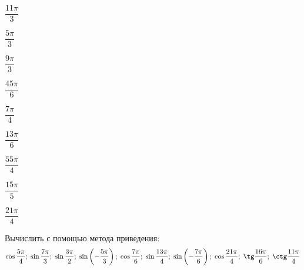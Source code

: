\begin{class}[number=3]
\begin{listofex}[resume]
\begin{enumcols}[itemcolumns=5]
			\item \( \dfrac{11\pi}{3} \)
			\item \( \dfrac{5\pi}{3} \)
			\item \( \dfrac{9\pi}{3} \)
			\item \( \dfrac{45\pi}{6} \)
			\item \( \dfrac{7\pi}{4} \)
			\item \( \dfrac{13\pi}{6} \)
			\item \( \dfrac{55\pi}{4} \)
			\item \( \dfrac{15\pi}{5} \)
			\item \( \dfrac{21\pi}{4} \)
		\end{enumcols}
		\item Вычислить с помощью метода приведения:
		\[ \cos\dfrac{5\pi}{4};\;\sin\dfrac{7\pi}{3};\;\sin\dfrac{3\pi}{2};\;\sin\left( -\dfrac{5\pi}{3} \right);\;\cos\dfrac{7\pi}{6};\;\sin\dfrac{13\pi}{4};\;\sin\left( -\dfrac{7\pi}{6}  \right);\;\cos\dfrac{21\pi}{4};\;\tg\dfrac{16\pi}{6};\;\ctg\dfrac{11\pi}{4} \]
	\end{listofex}
\end{class}
%
%
